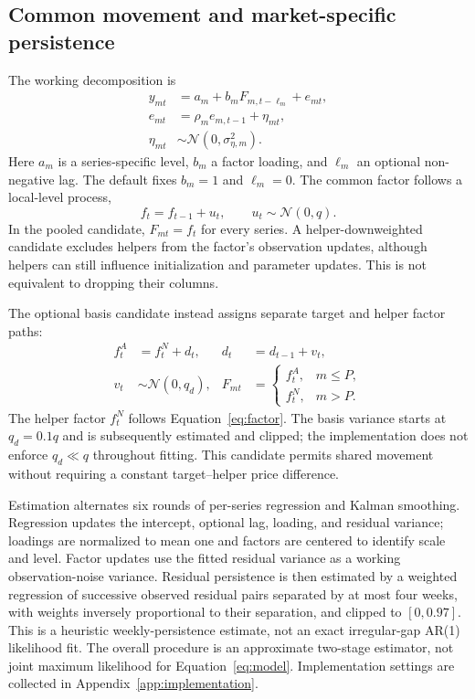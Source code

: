 \documentclass[sigconf,nonacm,balance=false]{acmart}
\newcommand{\Normal}{\mathcal{N}}
\begin{document}
\subsection{Common movement and market-specific persistence}

The working decomposition is
\begin{subequations}\label{eq:model}
\begin{align}
y_{mt} &= a_m+b_m F_{m,t-\ell_m}+e_{mt}, \label{eq:obs}\\
e_{mt} &= \rho_m e_{m,t-1}+\eta_{mt}, \label{eq:residual}\\
\eta_{mt} &\sim \Normal(0,\sigma_{\eta,m}^2).
\end{align}
\end{subequations}
Here $a_m$ is a series-specific level, $b_m$ a factor loading, and $\ell_m$ an optional non-negative lag. The default fixes $b_m=1$ and $\ell_m=0$. The common factor follows a local-level process,
\begin{equation}\label{eq:factor}
f_t=f_{t-1}+u_t,\qquad u_t\sim\Normal(0,q).
\end{equation}
In the pooled candidate, $F_{mt}=f_t$ for every series. A helper-downweighted candidate excludes helpers from the factor's observation updates, although helpers can still influence initialization and parameter updates. This is not equivalent to dropping their columns.

The optional basis candidate instead assigns separate target and helper factor paths:
\begin{subequations}\label{eq:basis}
\begin{align}
f^A_t &= f^N_t+d_t, & d_t&=d_{t-1}+v_t,\\
v_t &\sim\Normal(0,q_d), &
F_{mt}&=\begin{cases}f^A_t,&m\le P,\\f^N_t,&m>P.\end{cases}
\end{align}
\end{subequations}
The helper factor $f^N_t$ follows Equation~\eqref{eq:factor}. The basis variance starts at $q_d=0.1q$ and is subsequently estimated and clipped; the implementation does not enforce $q_d\ll q$ throughout fitting. This candidate permits shared movement without requiring a constant target--helper price difference.

Estimation alternates six rounds of per-series regression and Kalman smoothing. Regression updates the intercept, optional lag, loading, and residual variance; loadings are normalized to mean one and factors are centered to identify scale and level. Factor updates use the fitted residual variance as a working observation-noise variance. Residual persistence is then estimated by a weighted regression of successive observed residual pairs separated by at most four weeks, with weights inversely proportional to their separation, and clipped to $[0,0.97]$. This is a heuristic weekly-persistence estimate, not an exact irregular-gap AR(1) likelihood fit. The overall procedure is an approximate two-stage estimator, not joint maximum likelihood for Equation~\eqref{eq:model}. Implementation settings are collected in Appendix~\ref{app:implementation}.
\end{document}
